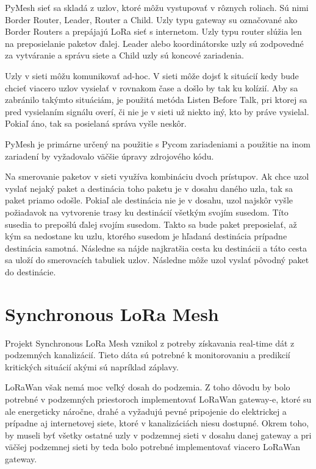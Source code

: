 \documentclass[slovak,master]{diploma}
\begin{document}
PyMesh sieť sa skladá z uzlov, ktoré môžu vystupovať v rôznych roliach. Sú nimi Border Router, Leader, Router a Child. Uzly typu gateway su označované ako Border Routers a prepájajú LoRa sieť s 
internetom. Uzly typu router slúžia len na preposielanie paketov ďalej. Leader alebo koordinátorske uzly sú zodpovedné za vytváranie a správu siete a Child uzly sú koncové 
zariadenia.

Uzly v sieti môžu komunikovať ad-hoc. V sieti môže dojsť k situácií kedy bude chcieť viacero uzlov vysielať v rovnakom čase a došlo by tak ku kolízií.
Aby sa zabránilo takýmto situáciám, je použitá metóda Listen Before Talk, pri ktorej sa pred vysielaním signálu overí, či nie je v sieti už niekto iný, kto by práve 
vysielal. Pokiaľ áno, tak sa posielaná správa vyšle neskôr.

PyMesh je primárne určený na použitie s Pycom zariadeniami a použitie na inom zariadení by vyžadovalo väčšie úpravy zdrojového kódu.

Na smerovanie paketov v sieti využíva kombináciu dvoch prístupov. Ak chce uzol vyslať nejaký paket a destinácia toho paketu je v dosahu daného uzla, tak sa paket priamo odošle. 
Pokiaľ ale destinácia nie je v dosahu, uzol najskôr vyšle požiadavok na vytvorenie trasy ku destinácií všetkým svojím susedom. Títo susedia to prepošlú ďalej svojím susedom. 
Takto sa bude paket preposielať, až kým sa nedostane ku uzlu, ktorého susedom je hľadaná destinácia prípadne destinácia samotná. Následne sa nájde najkratšia cesta ku destinácii a táto cesta sa uloží do smerovacích 
tabuliek uzlov. Následne môže uzol vyslať pôvodný paket do destinácie.


\section{Synchronous LoRa Mesh}
Projekt Synchronous LoRa Mesh \cite{synchronouslorameshnetwork} vznikol z potreby získavania real-time dát z podzemných kanalizácií. Tieto dáta sú potrebné k monitorovaniu a predikcií kritických situácií akými 
sú napríklad záplavy.

LoRaWan však nemá moc veľký dosah do podzemia. Z toho dôvodu by bolo potrebné v podzemných priestoroch implementovať LoRaWan gateway-e, ktoré su ale energeticky náročne, drahé a vyžadujú 
pevné pripojenie do elektrickej a prípadne aj internetovej siete, ktoré v kanalizáciách niesu dostupné. Okrem toho, by museli byť všetky ostatné uzly v podzemnej sieti v dosahu danej gateway a pri väčšej podzemnej sieti 
by teda bolo potrebné implementovať viacero LoRaWan gateway.
\end{document}
